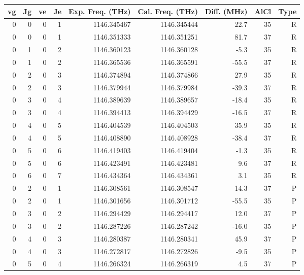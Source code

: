 \begin{table}
\begin{tabu}{rrrrrrrrr}
\toprule
vg & Jg & ve & Je & Exp. Freq. (THz) & Cal. Freq. (THz) & Diff. (MHz) & AlCl & Type\\ \midrule 
\rowfont{\color{red}}0 & 0 & 0 & 1 & 1146.345467 & 1146.345444 & 22.7 & 35 & R\\
\rowfont{\color{red}}0 & 0 & 0 & 1 & 1146.351333 & 1146.351251 & 81.7 & 37 & R\\
\rowfont{\color{red}}0 & 1 & 0 & 2 & 1146.360123 & 1146.360128 & -5.3 & 35 & R\\
\rowfont{\color{red}}0 & 1 & 0 & 2 & 1146.365536 & 1146.365591 & -55.5 & 37 & R\\
\rowfont{\color{red}}0 & 2 & 0 & 3 & 1146.374894 & 1146.374866 & 27.9 & 35 & R\\
\rowfont{\color{red}}0 & 2 & 0 & 3 & 1146.379944 & 1146.379984 & -39.3 & 37 & R\\
\rowfont{\color{red}}0 & 3 & 0 & 4 & 1146.389639 & 1146.389657 & -18.4 & 35 & R\\
\rowfont{\color{red}}0 & 3 & 0 & 4 & 1146.394413 & 1146.394429 & -16.5 & 37 & R\\
\rowfont{\color{red}}0 & 4 & 0 & 5 & 1146.404539 & 1146.404503 & 35.9 & 35 & R\\
\rowfont{\color{red}}0 & 4 & 0 & 5 & 1146.408890 & 1146.408928 & -38.4 & 37 & R\\
\rowfont{\color{red}}0 & 5 & 0 & 6 & 1146.419403 & 1146.419404 & -1.3 & 35 & R\\
\rowfont{\color{red}}0 & 5 & 0 & 6 & 1146.423491 & 1146.423481 & 9.6 & 37 & R\\
\rowfont{\color{red}}0 & 6 & 0 & 7 & 1146.434364 & 1146.434361 & 3.1 & 35 & R\\
\rowfont{\color{blue}}0 & 2 & 0 & 1 & 1146.308561 & 1146.308547 & 14.3 & 37 & P\\
\rowfont{\color{blue}}0 & 2 & 0 & 1 & 1146.301656 & 1146.301712 & -55.5 & 35 & P\\
\rowfont{\color{blue}}0 & 3 & 0 & 2 & 1146.294429 & 1146.294417 & 12.0 & 37 & P\\
\rowfont{\color{blue}}0 & 3 & 0 & 2 & 1146.287226 & 1146.287242 & -16.0 & 35 & P\\
\rowfont{\color{blue}}0 & 4 & 0 & 3 & 1146.280387 & 1146.280341 & 45.9 & 37 & P\\
\rowfont{\color{blue}}0 & 4 & 0 & 3 & 1146.272817 & 1146.272826 & -9.5 & 35 & P\\
\rowfont{\color{blue}}0 & 5 & 0 & 4 & 1146.266324 & 1146.266319 & 4.5 & 37 & P\\

\end{tabu}
\end{table}
